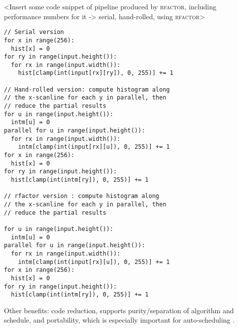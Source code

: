 <Insert some code snippet of pipeline produced by \textsc{rfactor}, including performance numbers for it -> serial, hand-rolled, using \textsc{rfactor}> \\

\begin{lstlisting}[caption={Histogram loop-ness generated by: serial version, hand-rollled parallel associative reduction version, and rfactor parallel associative reduction version}]
// Serial version
for x in range(256):
  hist[x] = 0
for ry in range(input.height()):
  for rx in range(input.width()):
    hist[clamp(int(input[rx][ry]), 0, 255)] += 1

// Hand-rolled version: compute histogram along 
// the x-scanline for each y in parallel, then 
// reduce the partial results
for u in range(input.height()):
  intm[u] = 0
parallel for u in range(input.height()):
  for rx in range(input.width()):
    intm[clamp(int(input[rx][u]), 0, 255)] += 1
for x in range(256):
  hist[x] = 0
for ry in range(input.height()):
  hist[clamp(int(intm[ry]), 0, 255)] += 1

// rfactor version : compute histogram along  
// the x-scanline for each y in parallel, then  
// reduce the partial results

for u in range(input.height()):
  intm[u] = 0
parallel for u in range(input.height()):
  for rx in range(input.width()):
    intm[clamp(int(input[rx][u]), 0, 255)] += 1
for x in range(256):
  hist[x] = 0
for ry in range(input.height()):
  hist[clamp(int(intm[ry]), 0, 255)] += 1
\end{lstlisting}

Other benefits: code reduction, supports purity/separation of algorithm and schedule, and portability, which is especially important for auto-scheduling \cite{Mullapudi:2016:ASH:2897824.2925952}. \\
